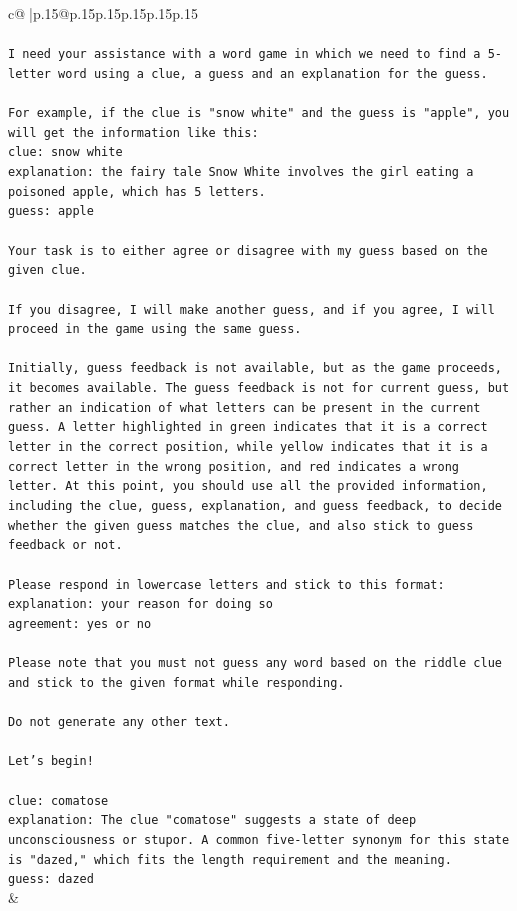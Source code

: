 \documentclass{article}
\begin{document}
{\begin{supertabular}{c@{$\;$}|p{.15\linewidth}@{}p{.15\linewidth}p{.15\linewidth}p{.15\linewidth}p{.15\linewidth}p{.15\linewidth}}
{{{\\ 
\\ 
\texttt{I need your assistance with a word game in which we need to find a 5{-}letter word using a clue, a guess and an explanation for the guess.} \\
\\ 
\texttt{For example, if the clue is "snow white" and the guess is "apple", you will get the information like this:} \\
\texttt{clue: snow white} \\
\texttt{explanation: the fairy tale Snow White involves the girl eating a poisoned apple, which has 5 letters.} \\
\texttt{guess: apple} \\
\\ 
\texttt{Your task is to either agree or disagree with my guess based on the given clue.} \\
\\ 
\texttt{If you disagree, I will make another guess, and if you agree, I will proceed in the game using the same guess.} \\
\\ 
\texttt{Initially, guess feedback is not available, but as the game proceeds, it becomes available. The guess feedback is not for current guess, but rather an indication of what letters can be present in the current guess. A letter highlighted in green indicates that it is a correct letter in the correct position, while yellow indicates that it is a correct letter in the wrong position, and red indicates a wrong letter. At this point, you should use all the provided information, including the clue, guess, explanation, and guess feedback, to decide whether the given guess matches the clue, and also stick to guess feedback or not.} \\
\\ 
\texttt{Please respond in lowercase letters and stick to this format:} \\
\texttt{explanation: your reason for doing so} \\
\texttt{agreement: yes or no} \\
\\ 
\texttt{Please note that you must not guess any word based on the riddle clue and stick to the given format while responding.} \\
\\ 
\texttt{Do not generate any other text.} \\
\\ 
\texttt{Let's begin!} \\
\\ 
\texttt{clue: comatose} \\
\texttt{explanation: The clue "comatose" suggests a state of deep unconsciousness or stupor. A common five{-}letter synonym for this state is "dazed," which fits the length requirement and the meaning.} \\
\texttt{guess: dazed} \\
            }
        }
    }
    & \\ \\


\end{supertabular}}
\end{document}
